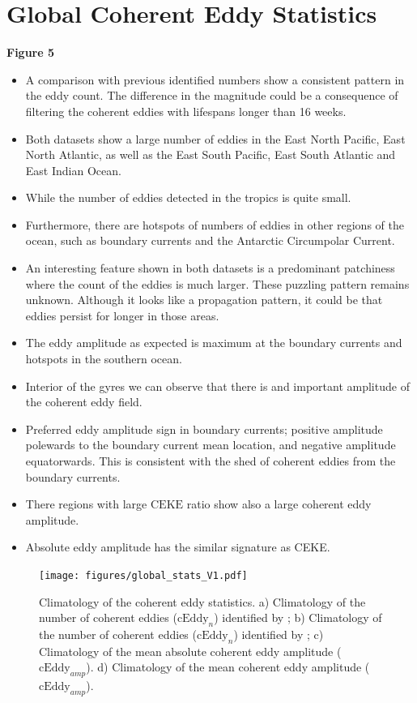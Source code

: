 \documentclass[draft,linenumbers]{agujournal2019}
\newcommand{\CEKE}{\textrm{CEKE}}
\newcommand{\cEddy}{\textrm{cEddy}}
\begin{document}
	\section{Global Coherent Eddy Statistics}
	\label{subsec:CE_stats}

	\textbf{Figure 5}
	\begin{itemize}
		\item A comparison with previous identified numbers show a consistent pattern in the eddy count. The difference in the magnitude could be a consequence of \citet{Chelton_Global_2007} filtering the coherent eddies with lifespans longer than 16 weeks. 
		\item Both datasets show a large number of eddies in the East North Pacific, East North Atlantic, as well as the East South Pacific, East South Atlantic and East Indian Ocean. 
		\item While the number of eddies detected in the tropics is quite small.
		\item Furthermore, there are hotspots of numbers of eddies in other regions of the ocean, such as boundary currents and the Antarctic Circumpolar Current. 
		\item An interesting feature shown in both datasets is a predominant patchiness where the count of the eddies is much larger. These puzzling pattern remains unknown. Although it looks like a propagation pattern, it could be that eddies persist for longer in those areas.
		\item The eddy amplitude as expected is maximum at the boundary currents and hotspots in the southern ocean.
		\item Interior of the gyres we can observe that there is and important amplitude of the coherent eddy field. 
		\item Preferred eddy amplitude sign in boundary currents; positive amplitude polewards to the boundary current mean location, and negative amplitude equatorwards. This is consistent with the shed of coherent eddies from the boundary currents.
		\item There regions with large $\CEKE$ ratio show also a large coherent eddy amplitude.
		\item Absolute eddy amplitude has the similar signature as CEKE.
	\end{itemize}

	\begin{figure}
	    \centering
	    \texttt{[image: figures/global\_stats\_V1.pdf]}
	    \caption{Climatology of the coherent eddy statistics. a) Climatology of the number of coherent eddies ($\cEddy_n$) identified by \citet{Chelton_Global_2007};  b) Climatology of the number of coherent eddies ($\cEddy_n$) identified by \citet{Martinez_TKE_2019}; c) Climatology of the mean absolute coherent eddy amplitude ($\cEddy_{amp}$). d) Climatology of the mean coherent eddy amplitude ($\cEddy_{amp}$).}
	    \label{fig:eddy_stats_climatology}
	\end{figure}
\end{document}
